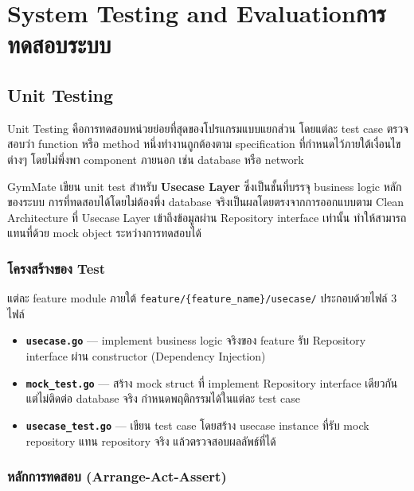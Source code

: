 \chapter{\ifenglish System Testing and Evaluation\else การทดสอบระบบ\fi}
\label{chap:eval}

\section{Unit Testing}
\label{sec:unit-testing}

\noindent
Unit Testing คือการทดสอบหน่วยย่อยที่สุดของโปรแกรมแบบแยกส่วน โดยแต่ละ test case ตรวจสอบว่า function หรือ method หนึ่งทำงานถูกต้องตาม specification ที่กำหนดไว้ภายใต้เงื่อนไขต่างๆ โดยไม่พึ่งพา component ภายนอก เช่น database หรือ network \cite{pressman2019}

GymMate เขียน unit test สำหรับ \textbf{Usecase Layer} ซึ่งเป็นชั้นที่บรรจุ business logic หลักของระบบ การที่ทดสอบได้โดยไม่ต้องพึ่ง database จริงเป็นผลโดยตรงจากการออกแบบตาม Clean Architecture ที่ Usecase Layer เข้าถึงข้อมูลผ่าน Repository interface เท่านั้น ทำให้สามารถแทนที่ด้วย mock object ระหว่างการทดสอบได้

\subsection{โครงสร้างของ Test}

แต่ละ feature module ภายใต้ \texttt{feature/\{feature\_name\}/usecase/} ประกอบด้วยไฟล์ 3 ไฟล์

\begin{itemize}
  \item \textbf{\texttt{usecase.go}} — implement business logic จริงของ feature รับ Repository interface ผ่าน constructor (Dependency Injection)
  \item \textbf{\texttt{mock\_test.go}} — สร้าง mock struct ที่ implement Repository interface เดียวกัน แต่ไม่ติดต่อ database จริง กำหนดพฤติกรรมได้ในแต่ละ test case
  \item \textbf{\texttt{usecase\_test.go}} — เขียน test case โดยสร้าง usecase instance ที่รับ mock repository แทน repository จริง แล้วตรวจสอบผลลัพธ์ที่ได้
\end{itemize}

\subsection{หลักการทดสอบ (Arrange-Act-Assert)}


